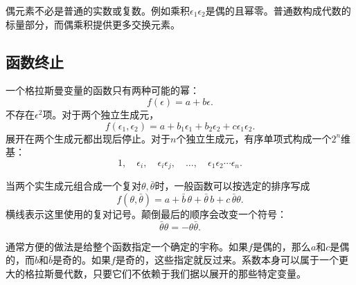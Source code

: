 偶元素不必是普通的实数或复数。例如乘积\(\epsilon_1\epsilon_2\)是偶的且幂零。普通数构成代数的标量部分，而偶乘积提供更多交换元素。

\begin{classroomqa}
\end{classroomqa}

\subsection{函数终止}

一个格拉斯曼变量的函数只有两种可能的幂：
\begin{equation}
f(\epsilon)=a+b\epsilon.
\end{equation}
不存在\(\epsilon^2\)项。对于两个独立生成元，
\begin{equation}
f(\epsilon_1,\epsilon_2)
=a+b_1\epsilon_1+b_2\epsilon_2+c\epsilon_1\epsilon_2.
\end{equation}
展开在两个生成元都出现后停止。对于\(n\)个独立生成元，有序单项式构成一个\(2^n\)维基：
\begin{equation}
1,\quad
\epsilon_i,\quad
\epsilon_i\epsilon_j,\quad
\ldots,\quad
\epsilon_1\epsilon_2\cdots\epsilon_n.
\end{equation}

当两个实生成元组合成一个复对\(\theta,\bar\theta\)时，一般函数可以按选定的排序写成
\begin{equation}
f(\theta,\bar\theta)
=a+\bar b\,\theta+\bar\theta\,b+c\,\bar\theta\theta.
\end{equation}
横线表示这里使用的复对记号。颠倒最后的顺序会改变一个符号：
\begin{equation}
\bar\theta\theta=-\theta\bar\theta.
\end{equation}

通常方便的做法是给整个函数指定一个确定的宇称。如果\(f\)是偶的，那么\(a\)和\(c\)是偶的，而\(b\)和\(\bar b\)是奇的。如果\(f\)是奇的，这些指定就反过来。系数本身可以属于一个更大的格拉斯曼代数，只要它们不依赖于我们据以展开的那些特定变量。

\begin{classroomqa}
\end{classroomqa}

